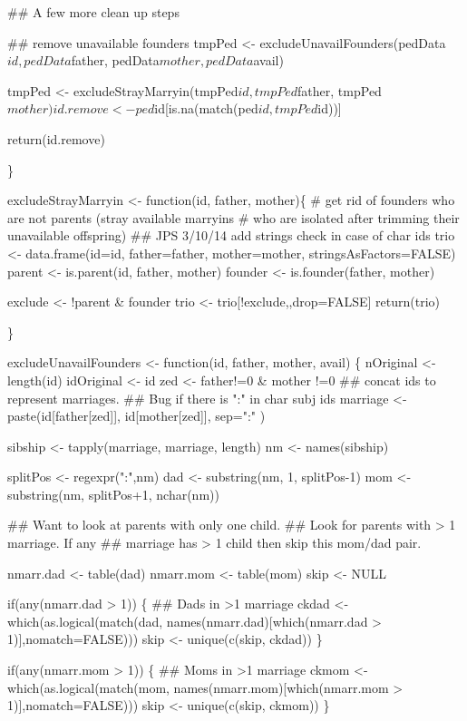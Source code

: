 \documentclass{article}
\begin{document}
\begin{nwchunk}
   ## A few more clean up steps
 
   ## remove unavailable founders
 tmpPed <- excludeUnavailFounders(pedData$id, 
 pedData$father, pedData$mother, pedData$avail)
 
 tmpPed <- excludeStrayMarryin(tmpPed$id, tmpPed$father, tmpPed$mother)
 
 id.remove <- ped$id[is.na(match(ped$id, tmpPed$id))]
 
 return(id.remove)
 
 \}
 
 excludeStrayMarryin <- function(id, father, mother)\{
   # get rid of founders who are not parents (stray available marryins
   # who are isolated after trimming their unavailable offspring)
   ## JPS 3/10/14 add strings check in case of char ids
 trio <- data.frame(id=id, father=father, mother=mother, stringsAsFactors=FALSE)
 parent <- is.parent(id, father, mother)
 founder <- is.founder(father, mother)
 
 exclude <- !parent & founder
 trio <- trio[!exclude,,drop=FALSE]
 return(trio)
 
 \}
 
 excludeUnavailFounders <- function(id, father, mother, avail)
 \{
   nOriginal <- length(id)
   idOriginal <- id   
   zed <- father!=0 & mother !=0
   ## concat ids to represent marriages. 
   ## Bug if there is ":" in char subj ids
   marriage <- paste(id[father[zed]], id[mother[zed]], sep=":" )
   
   sibship <- tapply(marriage, marriage, length)
   nm <- names(sibship)
   
   splitPos <- regexpr(":",nm)
   dad <- substring(nm, 1, splitPos-1)
   mom <- substring(nm, splitPos+1,  nchar(nm))
   
   ##  Want to look at parents with only one child.
   ##  Look for parents with > 1 marriage.  If any
   ##  marriage has > 1 child then skip this mom/dad pair.
   
   nmarr.dad <- table(dad)
   nmarr.mom <- table(mom)
   skip <- NULL
   
   if(any(nmarr.dad > 1)) \{
   ## Dads in >1 marriage
   ckdad <- which(as.logical(match(dad,
   names(nmarr.dad)[which(nmarr.dad > 1)],nomatch=FALSE)))
   skip <- unique(c(skip, ckdad))
   \}
   
   if(any(nmarr.mom > 1)) \{
   ## Moms in >1 marriage
   ckmom <- which(as.logical(match(mom,
   names(nmarr.mom)[which(nmarr.mom > 1)],nomatch=FALSE)))
   skip <- unique(c(skip, ckmom))
   \}
   

\end{nwchunk}
\end{document}
